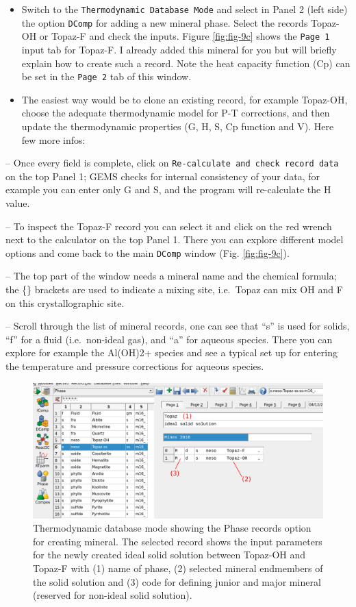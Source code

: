 \documentclass[
]{book}
\begin{document}
\begin{itemize}
\item
  Switch to the \texttt{Thermodynamic\ Database\ Mode} and select in Panel 2 (left side) the option \texttt{DComp} for adding a new mineral phase. Select the records Topaz-OH or Topaz-F and check the inputs. Figure \ref{fig:fig-9c} shows the \texttt{Page\ 1} input tab for Topaz-F. I already added this mineral for you but will briefly explain how to create such a record. Note the heat capacity function (Cp) can be set in the \texttt{Page\ 2} tab of this window.
\item
  The easiest way would be to clone an existing record, for example Topaz-OH, choose the adequate thermodynamic model for P-T corrections, and then update the thermodynamic properties (G, H, S, Cp function and V). Here few more infos:
\end{itemize}

-- Once every field is complete, click on \texttt{Re-calculate\ and\ check\ record\ data} on the top Panel 1; GEMS checks for internal consistency of your data, for example you can enter only G and S, and the program will re-calculate the H value.

-- To inspect the Topaz-F record you can select it and click on the red wrench next to the calculator on the top Panel 1. There you can explore different model options and come back to the main \texttt{DComp} window (Fig. \ref{fig:fig-9c}).

-- The top part of the window needs a mineral name and the chemical formula; the \{\} brackets are used to indicate a mixing site, i.e.~Topaz can mix OH and F on this crystallographic site.

-- Scroll through the list of mineral records, one can see that ``s'' is used for solids, ``f'' for a fluid (i.e.~non-ideal gas), and ``a'' for aqueous species. There you can explore for example the Al(OH)2+ species and see a typical set up for entering the temperature and pressure corrections for aqueous species.

\begin{figure}
\includegraphics[width=1\linewidth]{figures/module3/fig-10} \caption{Thermodynamic database mode showing the Phase records option for creating mineral. The selected record shows the input parameters for the newly created ideal solid solution between Topaz-OH and Topaz-F with (1) name of phase, (2) selected mineral endmembers of the solid solution and (3) code for defining junior and major mineral (reserved for non-ideal solid solution).}\label{fig:fig-10c}
\end{figure}
\end{document}
